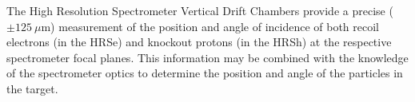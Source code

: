 




The High Resolution Spectrometer Vertical Drift Chambers provide a
precise ($\pm 125~\mu$m) measurement of the position and angle of
incidence of both recoil electrons (in the HRSe) and knockout protons
(in the HRSh) at the respective spectrometer focal planes.  This
information may be combined with the knowledge of the spectrometer
optics to determine the position and angle of the particles in the
target.

